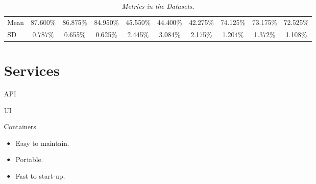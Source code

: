 \documentclass[dvipsnames,mathserif]{beamer}
\begin{document}
{\begin{frame}
\begin{table}
\begin{adjustbox}{width=\textwidth}
\begin{tabular}{lccccccccc}
      \midrule

      \cellcolor{gray!50}Mean & \cellcolor{gray!50}87.600\% & \cellcolor{gray!50}86.875\% & \cellcolor{gray!50}84.950\% & \cellcolor{gray!50}45.550\% & \cellcolor{gray!50}44.400\% & \cellcolor{gray!50}42.275\% & \cellcolor{gray!50}74.125\% & \cellcolor{gray!50}73.175\% & \cellcolor{gray!50}72.525\% \\
      \cellcolor{gray!50}SD & \cellcolor{gray!50}0.787\% & \cellcolor{gray!50}0.655\% & \cellcolor{gray!50}0.625\% & \cellcolor{gray!50}2.445\% & \cellcolor{gray!50}3.084\% & \cellcolor{gray!50}2.175\% & \cellcolor{gray!50}1.204\% & \cellcolor{gray!50}1.372\% &  \cellcolor{gray!50}1.108\% \\

      \bottomrule
    \end{tabular}
  \end{adjustbox}
    \caption[Metrics in the Datasets]
    {\textit{Metrics in the Datasets. }}
    {\label{table:resume-metrics}}
  \end{table}
    \end{frame}




    \section{Services}

    \begin{frame}

      \large API
      \vspace{0.25cm}

    \end{frame}


    \begin{frame}
      \large UI
      \vspace{0.25cm}
    \end{frame}


    \begin{frame}
      \large Containers
      \vspace{0.25cm}


      \begin{itemize}
        \item Easy to maintain.
        \item Portable.
        \item Fast to start-up.
      \end{itemize}


    \end{frame}

}
\end{document}

